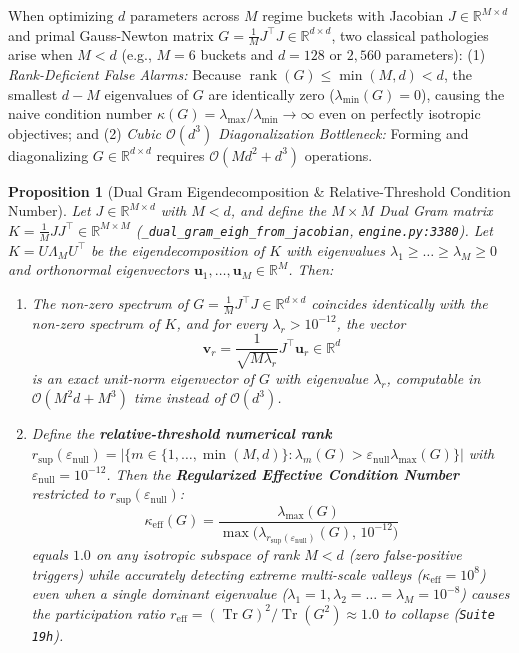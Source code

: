 \documentclass[11pt,a4paper]{article}
\newtheorem{proposition}{Proposition}
\begin{document}
When optimizing $d$ parameters across $M$ regime buckets with Jacobian $J \in \mathbb{R}^{M \times d}$ and primal Gauss-Newton matrix $G = \frac{1}{M}J^\top J \in \mathbb{R}^{d \times d}$, two classical pathologies arise when $M < d$ (e.g., $M = 6$ buckets and $d = 128$ or $2,560$ parameters):
(1) \emph{Rank-Deficient False Alarms:} Because $\operatorname{rank}(G) \le \min(M, d) < d$, the smallest $d - M$ eigenvalues of $G$ are identically zero ($\lambda_{\min}(G) = 0$), causing the naive condition number $\kappa(G) = \lambda_{\max}/\lambda_{\min} \to \infty$ even on perfectly isotropic objectives; and
(2) \emph{Cubic $\mathcal{O}(d^3)$ Diagonalization Bottleneck:} Forming and diagonalizing $G \in \mathbb{R}^{d \times d}$ requires $\mathcal{O}(M d^2 + d^3)$ operations.

\begin{proposition}[Dual Gram Eigendecomposition \& Relative-Threshold Condition Number]
\label{prop:dual_gram}
Let $J \in \mathbb{R}^{M \times d}$ with $M < d$, and define the $M \times M$ Dual Gram matrix $K = \frac{1}{M} J J^\top \in \mathbb{R}^{M \times M}$ (\texttt{\_dual\_gram\_eigh\_from\_jacobian}, \texttt{engine.py:3380}). Let $K = U \Lambda_M U^\top$ be the eigendecomposition of $K$ with eigenvalues $\lambda_1 \ge \dots \ge \lambda_M \ge 0$ and orthonormal eigenvectors $\mathbf{u}_1, \dots, \mathbf{u}_M \in \mathbb{R}^M$. Then:
\begin{enumerate}
\item The non-zero spectrum of $G = \frac{1}{M}J^\top J \in \mathbb{R}^{d \times d}$ coincides identically with the non-zero spectrum of $K$, and for every $\lambda_r > 10^{-12}$, the vector
\begin{equation}
\mathbf{v}_r = \frac{1}{\sqrt{M \lambda_r}} J^\top \mathbf{u}_r \in \mathbb{R}^d
\tag{11}\label{eq:dual_eigvec}
\end{equation}
is an exact unit-norm eigenvector of $G$ with eigenvalue $\lambda_r$, computable in $\mathcal{O}(M^2 d + M^3)$ time instead of $\mathcal{O}(d^3)$.
\item Define the \textbf{relative-threshold numerical rank} $r_{\sup}(\varepsilon_{\text{null}}) = \bigl|\{m \in \{1, \dots, \min(M, d)\} : \lambda_m(G) > \varepsilon_{\text{null}}\lambda_{\max}(G)\}\bigr|$ with $\varepsilon_{\text{null}} = 10^{-12}$. Then the \textbf{Regularized Effective Condition Number} restricted to $r_{\sup}(\varepsilon_{\text{null}})$:
\begin{equation}
\kappa_{\text{eff}}(G) = \frac{\lambda_{\max}(G)}{\max\bigl(\lambda_{r_{\sup}(\varepsilon_{\text{null}})}(G),\, 10^{-12}\bigr)}
\tag{12}\label{eq:kappa_eff}
\end{equation}
equals $1.0$ on any isotropic subspace of rank $M < d$ (zero false-positive triggers) while accurately detecting extreme multi-scale valleys ($\kappa_{\text{eff}} = 10^8$) even when a single dominant eigenvalue ($\lambda_1 = 1, \lambda_2 = \dots = \lambda_M = 10^{-8}$) causes the participation ratio $r_{\text{eff}} = (\operatorname{Tr} G)^2/\operatorname{Tr}(G^2) \approx 1.0$ to collapse (\texttt{Suite 19h}).
\end{enumerate}
\end{proposition}
\end{document}
